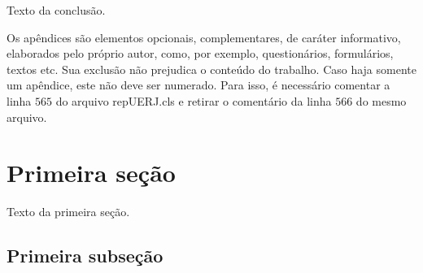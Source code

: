 \documentclass[a4paper,12pt,oneside,onecolumn,final,fleqn]{repUERJ}
\begin{document}
Texto da conclusão.





\backmatter %




% 
% 




\appendix %


Os apêndices são elementos opcionais, complementares, de caráter informativo, elaborados pelo próprio autor, como, por exemplo, questionários, formulários, textos etc. Sua exclusão não prejudica o conteúdo do trabalho. Caso haja somente um apêndice, este não deve ser numerado. Para isso, é necessário comentar a linha $565$ do arquivo repUERJ.cls e retirar o comentário da linha $566$ do mesmo arquivo.

\section{Primeira seção}

Texto da primeira seção.

\subsection{Primeira subseção}
\end{document}
